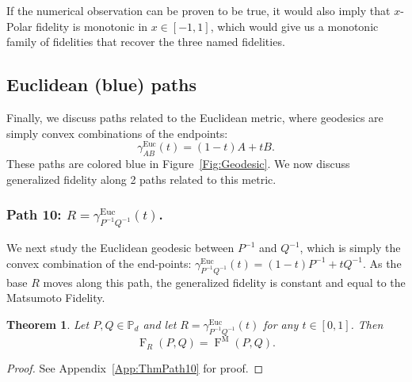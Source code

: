 \documentclass[12pt]{article}
\newtheorem{theorem}{Theorem}[section] %
\theoremstyle{definition}
\begin{document}
If the numerical observation can be proven to be true, it would also imply that $x$-Polar fidelity is monotonic in $x \in [-1,1]$, which would give us a monotonic family of fidelities that recover the three named fidelities. 


\subsection{Euclidean (blue) paths}
Finally, we discuss paths related to the Euclidean metric, where geodesics are simply convex combinations of the endpoints:
\begin{equation}
    \gamma_{AB}^{\text{Euc}}(t) = (1-t) A + t B.
\end{equation}
These paths are colored blue in Figure~\ref{Fig:Geodesic}. We now discuss generalized fidelity along 2 paths related to this metric.

\subsubsection*{Path 10: $R = \gamma^\text{Euc}_{P^{-1} Q^{-1}}(t)$.}
We next study the Euclidean geodesic between $P ^{-1} $ and $Q ^{-1} $, which is simply the convex combination of the end-points: $\gamma^\mathrm{Euc}_{P ^{-1} Q ^{-1} } (t)  = (1-t) P ^{-1} + t Q ^{-1} $. As the base $R$ moves along this path, the generalized fidelity is constant and equal to the Matsumoto Fidelity.
\begin{theorembox}
    \begin{theorem}\label{Thm:Path10}
        Let $P, Q \in \mathbb P_d$ and let $R = \gamma_{P ^{-1} Q ^{-1} }^\mathrm{Euc}(t)$ for any $t \in [0,1]$. Then 
        \begin{equation}
             \operatorname{F}_R(P,Q) = \operatorname{F}^\mathrm M(P,Q). 
        \end{equation}
    \end{theorem}
\end{theorembox}
\begin{proof}
    See Appendix~\ref{App:ThmPath10} for proof.
\end{proof}
\end{document}
